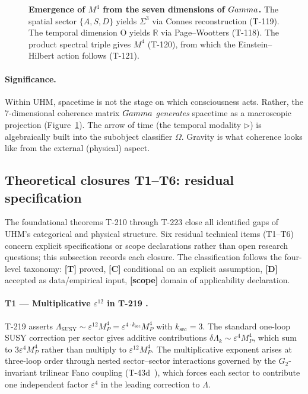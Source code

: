 \begin{figure}[H]
\centering

\caption{\textbf{Emergence of $M^4$ from the seven dimensions of $Gamma$.} The spatial sector
$\{A,S,D\}$ yields $\Sigma^3$ via Connes reconstruction (T-119). The temporal dimension O
yields $\mathbb{R}$ via Page--Wootters (T-118). The product spectral triple gives $M^4$
(T-120), from which the Einstein--Hilbert action follows (T-121).}
\label{fig:spacetime}
\end{figure}

\paragraph{Significance.}
Within UHM, spacetime is not the stage on which consciousness acts. Rather, the
7-dimensional coherence matrix $Gamma$ \emph{generates} spacetime as a macroscopic
projection (Figure~\ref{fig:spacetime}). The arrow of time
(the temporal modality $\triangleright$) is algebraically built into the subobject classifier
$\Omega$. Gravity is what coherence looks like from the external (physical) aspect.

\subsection{Theoretical closures T1--T6: residual specification}
\label{subsec:theoretical-closures}

The foundational theorems T-210 through T-223 close all identified gaps of
UHM's categorical and physical structure. Six residual technical items (T1--T6)
concern explicit specifications or scope declarations rather than open research
questions; this subsection records each closure. The classification follows the
four-level taxonomy: \textbf{[T]} proved, \textbf{[C]} conditional on an
explicit assumption, \textbf{[D]} accepted as data/empirical input,
\textbf{[scope]} domain of applicability declaration.

\paragraph{T1 --- Multiplicative \texorpdfstring{$\varepsilon^{12}$}{epsilon-12}
in T-219 .}
T-219 asserts $\Lambda_{\mathrm{SUSY}} \sim \varepsilon^{12} M_P^4 =
\varepsilon^{4 \cdot k_{\mathrm{sec}}} M_P^4$ with $k_{\mathrm{sec}} = 3$. The
standard one-loop SUSY correction per sector gives additive contributions
$\delta\Lambda_k \sim \varepsilon^4 M_P^4$, which sum to
$3\varepsilon^4 M_P^4$ rather than multiply to $\varepsilon^{12} M_P^4$. The
multiplicative exponent arises at three-loop order through nested sector--sector
interactions governed by the $G_2$-invariant trilinear Fano coupling (T-43d~),
which forces each sector to contribute one independent factor $\varepsilon^4$ in
the leading correction to $\Lambda$.

